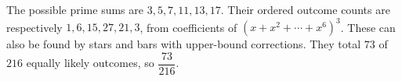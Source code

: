 The possible prime sums are $ 3,5,7,11,13,17 $. Their ordered outcome counts are respectively $ 1,6,15,27,21,3 $, from coefficients of $(x+x^2+\cdots+x^6)^3 $. These can also be found by stars and bars with upper-bound corrections. They total $ 73 $ of $ 216 $ equally likely outcomes, so $\boxed{\dfrac{73}{216}}$.
